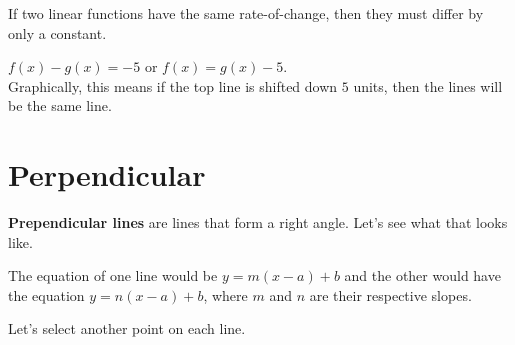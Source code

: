 \documentclass{ximera}
\begin{document}
If two linear functions have the same rate-of-change, then they must differ by only a constant. 


$f(x) - g(x) = -5$ or $f(x) = g(x) - 5$. \\

Graphically, this means if the top line is shifted down $5$ units, then the lines will be the same line.










\section{Perpendicular}

\textbf{Prependicular lines} are lines that form a right angle.   Let's see what that looks like.





\begin{image}
\end{image}



The equation of one line would be $y = m(x-a) + b$ and the other would have the equation $y = n(x-a) + b$, where $m$ and $n$ are their respective slopes.

Let's select another point on each line.
\end{document}
